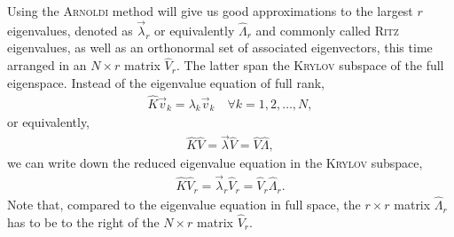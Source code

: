 Using the \textsc{Arnoldi} method will give us good approximations to the largest $r$ eigenvalues, denoted as $\vec{\lambda}_{r}$ or equivalently $\hat{\Lambda}_{r}$ and commonly called \textsc{Ritz} eigenvalues, as well as an orthonormal set of associated eigenvectors, this time arranged in an $N \times r$ matrix $\hat{V}_{r}$. The latter span the \textsc{Krylov} subspace of the full eigenspace. Instead of the eigenvalue equation of full rank,
\begin{gather}
  \hat{K} \vec{v}_{k} = \lambda_{k} \vec{v}_{k} \quad \forall k = 1, 2, \dotsc, N,
\end{gather}
or equivalently,
\begin{gather}
  \hat{K} \hat{V} = \vec{\lambda} \hat{V} = \hat{V} \hat{\Lambda},
\end{gather}
we can write down the reduced eigenvalue equation in the \textsc{Krylov} subspace,
\begin{gather}
  \hat{K} \hat{V}_{r} = \vec{\lambda}_{r} \hat{V}_{r} = \hat{V}_{r} \hat{\Lambda}_{r}. \label{eq:reduced_eigvals}
\end{gather}
Note that, compared to the eigenvalue equation in full space, the $r \times r$ matrix $\hat{\Lambda}_{r}$ has to be to the right of the $N \times r$ matrix $\hat{V}_{r}$.

